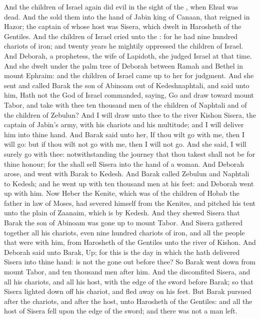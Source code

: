 \begin{biblechapter} %
 And the children of Israel again did evil in the sight of the \LORD, when Ehud was dead.
\verse And the \LORD sold them into the hand of Jabin king of Canaan, that reigned in Hazor; the captain of whose host was Sisera, which dwelt in Harosheth of the Gentiles.
\verse And the children of Israel cried unto the \LORD: for he had nine hundred chariots of iron; and twenty years he mightily oppressed the children of Israel.
\verse And Deborah, a prophetess, the wife of Lapidoth, she judged Israel at that time.
\verse And she dwelt under the palm tree of Deborah between Ramah and Bethel in mount Ephraim: and the children of Israel came up to her for judgment.
\verse And she sent and called Barak the son of Abinoam out of Kedeshnaphtali, and said unto him, Hath not the \LORD God of Israel commanded, saying, Go and draw toward mount Tabor, and take with thee ten thousand men of the children of Naphtali and of the children of Zebulun?
\verse And I will draw unto thee to the river Kishon Sisera, the captain of Jabin's army, with his chariots and his multitude; and I will deliver him into thine hand.
\verse And Barak said unto her, If thou wilt go with me, then I will go: but if thou wilt not go with me, then I will not go.
\verse And she said, I will surely go with thee: notwithstanding the journey that thou takest shall not be for thine honour; for the \LORD shall sell Sisera into the hand of a woman. And Deborah arose, and went with Barak to Kedesh.
\verse And Barak called Zebulun and Naphtali to Kedesh; and he went up with ten thousand men at his feet: and Deborah went up with him.
\verse Now Heber the Kenite, which was of the children of Hobab the father in law of Moses, had severed himself from the Kenites, and pitched his tent unto the plain of Zaanaim, which is by Kedesh.
\verse And they shewed Sisera that Barak the son of Abinoam was gone up to mount Tabor.
\verse And Sisera gathered together all his chariots, even nine hundred chariots of iron, and all the people that were with him, from Harosheth of the Gentiles unto the river of Kishon.
\verse And Deborah said unto Barak, Up; for this is the day in which the \LORD hath delivered Sisera into thine hand: is not the \LORD gone out before thee? So Barak went down from mount Tabor, and ten thousand men after him.
\verse And the \LORD discomfited Sisera, and all his chariots, and all his host, with the edge of the sword before Barak; so that Sisera lighted down off his chariot, and fled away on his feet.
\verse But Barak pursued after the chariots, and after the host, unto Harosheth of the Gentiles: and all the host of Sisera fell upon the edge of the sword; and there was not a man left.

\end{biblechapter}

